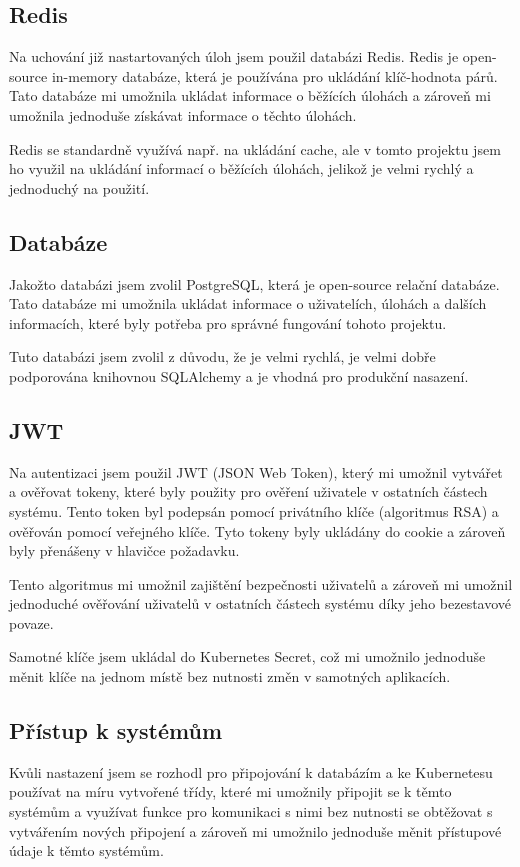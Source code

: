 \documentclass[12pt, a4paper,
oneside,      %
openright
]{report}
\begin{document}
\subsection{Redis}
Na uchování již nastartovaných úloh jsem použil databázi Redis. Redis je open-source in-memory databáze, která je používána pro ukládání klíč-hodnota párů. Tato databáze mi umožnila ukládat informace o běžících úlohách a zároveň mi umožnila jednoduše získávat informace o těchto úlohách.

Redis se standardně využívá např. na ukládání cache, ale v tomto projektu jsem ho využil na ukládání informací o běžících úlohách, jelikož je velmi rychlý a jednoduchý na použití.

\subsection{Databáze}
Jakožto databázi jsem zvolil PostgreSQL, která je open-source relační databáze. Tato databáze mi umožnila ukládat informace o uživatelích, úlohách a dalších informacích, které byly potřeba pro správné fungování tohoto projektu. 

Tuto databázi jsem zvolil z důvodu, že je velmi rychlá, je velmi dobře podporována knihovnou SQLAlchemy a je vhodná pro produkční nasazení.

\subsection{JWT}
Na autentizaci jsem použil JWT (JSON Web Token), který mi umožnil vytvářet a ověřovat tokeny, které byly použity pro ověření uživatele v ostatních částech systému. Tento token byl podepsán pomocí privátního klíče (algoritmus RSA) a ověřován pomocí veřejného klíče. Tyto tokeny byly ukládány do cookie a zároveň byly přenášeny v hlavičce požadavku.

Tento algoritmus mi umožnil zajištění bezpečnosti uživatelů a zároveň mi umožnil jednoduché ověřování uživatelů v ostatních částech systému díky jeho bezestavové povaze.

Samotné klíče jsem ukládal do Kubernetes Secret, což mi umožnilo jednoduše měnit klíče na jednom místě bez nutnosti změn v samotných aplikacích.

\subsection{Přístup k systémům}
Kvůli nastazení jsem se rozhodl pro připojování k databázím a ke Kubernetesu používat na míru vytvořené třídy, které mi umožnily připojit se k těmto systémům a využívat funkce pro komunikaci s nimi bez nutnosti se obtěžovat s vytvářením nových připojení a zároveň mi umožnilo jednoduše měnit přístupové údaje k těmto systémům.
\end{document}
